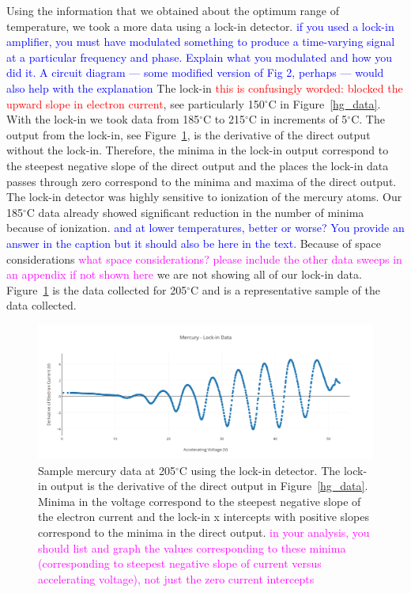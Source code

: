 \documentclass[prb,preprint]{revtex4-1}
\begin{document}
Using the information that we obtained about the optimum range of temperature, we took a more data using a lock-in detector. \textcolor{blue}{if you used a lock-in amplifier, you must have modulated something to produce a time-varying signal at a particular frequency and phase. Explain what you modulated and how you did it. A circuit diagram --- some modified version of Fig 2, perhaps --- would also help with the explanation} The lock-in \textcolor{red}{this is confusingly worded: blocked the upward slope in electron current}, see particularly 150$^{\circ}$C in Figure~\ref{hg_data}. With the lock-in we took data from 185$^{\circ}$C to 215$^{\circ}$C in increments of 5$^{\circ}$C. The output from the lock-in, see Figure~\ref{hg_lockin}, is the derivative of the direct output without the lock-in. Therefore, the minima in the lock-in output correspond to the steepest negative slope of the direct output and the places the lock-in data passes through zero correspond to the minima and maxima of the direct output. The lock-in detector was highly sensitive to ionization of the mercury atoms. Our 185$^{\circ}$C data already showed significant reduction in the number of minima because of ionization. \textcolor{blue}{and at lower temperatures, better or worse? You provide an answer in the caption but it should also be here in the text.} Because of space considerations \textcolor{magenta}{what space considerations? please include the other data sweeps in an appendix if not shown here} we are not showing all of our lock-in data. Figure~\ref{hg_lockin} is the data collected for 205$^{\circ}$C and is a representative sample of the data collected.

\begin{figure}[h!]
\centering

\includegraphics[width=6in]{hg_lockin.pdf}
\caption{Sample mercury data at 205$^{\circ}$C using the lock-in detector. The lock-in output is the derivative of the direct output in Figure~\ref{hg_data}. Minima in the voltage correspond to the steepest negative slope of the electron current and the lock-in x intercepts with positive slopes correspond to the minima in the direct output. \textcolor{magenta}{in your analysis, you should list and graph the values corresponding to these minima (corresponding to steepest negative slope of current versus accelerating voltage), not just the zero current intercepts} }

\label{hg_lockin}
\end{figure}
\end{document}
